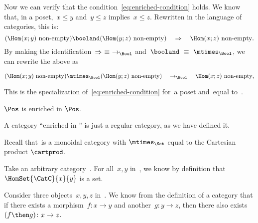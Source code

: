 {\begin{example}
        Now we can verify that the condition~\cref{eq:enriched-condition} holds. We
        know that, in a poset,~$x \leq y$ and~$y \leq z$ implies~$x \leq z$.
%
        Rewritten in the language of categories, this is:
        \begin{equation*}
        (\Hom(x;y)\ \text{non-empty})
            \booland
            (\Hom(y; z)\ \text{non-empty})
            \quad
            \Rightarrow
            \quad
            \Hom(x; z)\ \text{non-empty}.
        \end{equation*}
        By making the identification~$\Rightarrow\ \equiv\ \to_{\Bool}$ and~$\booland\ \equiv\ \mtimes_{\Bool}$, we can rewrite the above as
        \begin{widepar}
            \begin{equation*}
            (\Hom(x;y)\ \text{non-empty})
                \mtimes_{\Bool}
                (\Hom(y; z)\ \text{non-empty})
                \quad
                \to_{\Bool}
                \quad
                \Hom(x; z)\ \text{non-empty},
            \end{equation*}
        \end{widepar}
        This is the specialization of~\cref{eq:enriched-condition}
        for~\CatC a poset and~\CatD equal to~\Bool.
    \end{example}
    \begin{example}
        $\Pos$ is enriched in $\Pos$.
    \end{example}

    \begin{example}
    \end{example}

    \begin{example}
        A category ``enriched in \Set'' is just a regular category, as we have defined it.

        Recall that~\Set is a monoidal category with $\mtimes_{\Set}$ equal to the Cartesian product $\cartprod$.

        Take an arbitrary category~\CatC. For all~$x, y$ in~\CatC, we know by definition
        that~$\HomSet{\CatC}{x}{y}$ is a set.

        Consider three objects~$x,y,z$ in~\CatC. We know from the definition of a
        category that if there exists a morphism~$f: x \to y$ and another~$g: y \to z$,
        then there also exists~$(f\then g)\colon x \to z$.


\end{example}}
